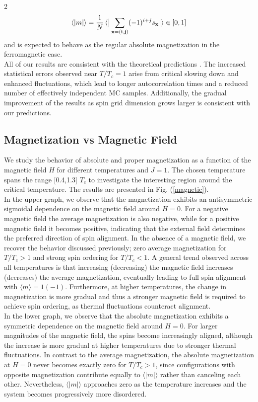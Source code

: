 \documentclass{article}
\begin{document}
\begin{multicols}{2}
\begin{align}
    \braket{|m|} = \frac{1}{N} \braket{\big|\sum_\mathbf{x=(i,j)} (-1)^{i+j}s_\mathbf{x}\big|} \in [0,1]
\end{align}
%
and is expected to behave as the regular absolute magnetization in the ferromagnetic case.\\

All of our results are consistent with the theoretical predictions \cite{computational_book}. The increased statistical errors observed near $T/T_c = 1$ arise from critical slowing down and enhanced fluctuations, which lead to longer autocorrelation times and a reduced number of effectively independent MC samples. Additionally, the gradual improvement of the results as spin grid dimension grows larger is consistent with our predictions.

\subsection{Magnetization vs Magnetic Field}
\label{sec_magnetic}

We study the behavior of absolute and proper magnetization as a function of the magnetic field $H$ for different temperatures and $J=1$. The chosen temperature spans the range [0.4,1.3] $T_c$ to investigate the interesting region around the critical temperature. The results are presented in Fig. (\ref{magnetic}).\\

In the upper graph, we observe that the magnetization exhibits an antisymmetric sigmoidal dependence on the magnetic field around $H=0$. For a negative magnetic field the average magnetization is also negative, while for a positive magnetic field it becomes positive, indicating that the external field determines the preferred direction of spin alignment. In the absence of a magnetic field, we recover the behavior discussed previously; zero average magnetization for $T/T_c > 1$ and strong spin ordering for $T/T_c < 1$. A general trend observed across all temperatures is that increasing (decreasing) the magnetic field increases (decreases) the average magnetization, eventually leading to full spin alignment with $\langle m\rangle=1 (-1)$. Furthermore, at higher temperatures, the change in magnetization is more gradual and thus a stronger magnetic field is required to achieve spin ordering, as thermal fluctuations counteract alignment.\\

In the lower graph, we observe that the absolute magnetization exhibits a symmetric dependence on the magnetic field around $H=0$.  For larger magnitudes of the magnetic field, the spins become increasingly aligned, although the increase is more gradual at higher temperatures due to stronger thermal fluctuations. In contrast to the average magnetization, the absolute magnetization at $H=0$ never becomes exactly zero for $T/T_c > 1$, since configurations with opposite magnetization contribute equally to $\langle |m| \rangle$ rather than canceling each other. Nevertheless, $\langle |m| \rangle$ approaches zero as the temperature increases and the system becomes progressively more disordered.


\end{multicols}
\end{document}
